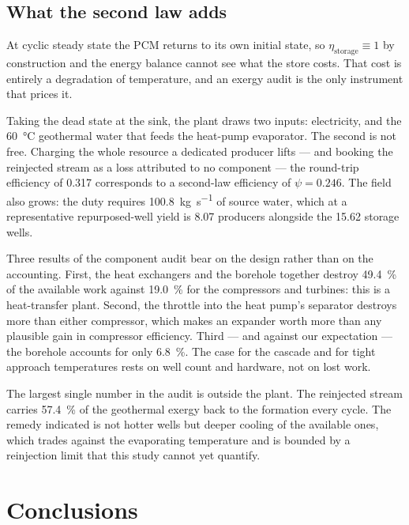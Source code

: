 \subsection{What the second law adds}
\label{sec:demo:exergy}

At cyclic steady state the PCM returns to its own initial state, so
$\eta_{\mathrm{storage}}\equiv1$ by construction and the energy balance
cannot see what the store costs. That cost is entirely a degradation of
temperature, and an exergy audit is the only instrument that prices it.

Taking the dead state at the sink, the plant draws two inputs: electricity,
and the \SI{60}{\celsius} geothermal water that feeds the heat-pump
evaporator. The second is not free. Charging the whole resource a dedicated
producer lifts --- and booking the reinjected stream as a loss attributed to
no component --- the round-trip efficiency of \num{0.317} corresponds to a
second-law efficiency of $\psi=\num{0.246}$. The field also grows: the duty
requires \SI{100.8}{\kilo\gram\per\second} of source water, which at a
representative repurposed-well yield is \num{8.07} producers alongside the
\num{15.62} storage wells.

Three results of the component audit bear on the design rather than on the
accounting. First, the heat exchangers and the borehole together destroy
\SI{49.4}{\percent} of the available work against \SI{19.0}{\percent} for the
compressors and turbines: this is a heat-transfer plant. Second, the throttle
into the heat pump's separator destroys more than either compressor, which
makes an expander worth more than any plausible gain in compressor
efficiency. Third --- and against our expectation --- the borehole accounts
for only \SI{6.8}{\percent}. The case for the cascade and for tight approach
temperatures rests on well count and hardware, not on lost work.

The largest single number in the audit is outside the plant. The reinjected
stream carries \SI{57.4}{\percent} of the geothermal exergy back to the
formation every cycle. The remedy indicated is not hotter wells but deeper
cooling of the available ones, which trades against the evaporating
temperature and is bounded by a reinjection limit that this study cannot yet
quantify.

\section{Conclusions}
\label{sec:conclusions}

